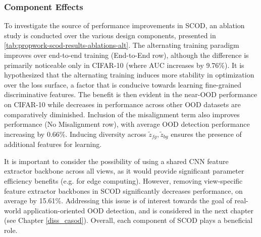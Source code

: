 \subsubsection{Component Effects}
To investigate the source of performance improvements in SCOD, an ablation study is conducted over the various design components, presented in \ref{tab:propwork-scod-results-ablations-alt}. The alternating training paradigm improves over end-to-end training (End-to-End row), although the difference is primarily noticeable only in CIFAR-10 (where AUC increases by 9.76\%). It is hypothesized that the alternating training induces more stability in optimization over the loss surface, a factor that is conducive towards learning fine-grained discriminative features. The benefit is then evident in the near-OOD performance on CIFAR-10 while decreases in performance across other OOD datasets are comparatively diminished. Inclusion of the misalignment term also improves performance (No Misalignment row), with average OOD detection performance increasing by 0.66\%. Inducing diversity across $\tilde{z}_{fg}, \tilde{z}_{bg}$ ensures the presence of additional features for learning.

It is important to consider the possibility of using a shared CNN feature extractor backbone across all views, as it would provide significant parameter efficiency benefits (e.g. for edge computing). However, removing view-specific feature extractor backbones in SCOD significantly decreases performance, on average by 15.61\%. Addressing this issue is of interest towards the goal of real-world application-oriented OOD detection, and is considered in the next chapter (see Chapter \ref{diss_casod}). Overall, each component of SCOD plays a beneficial role.


